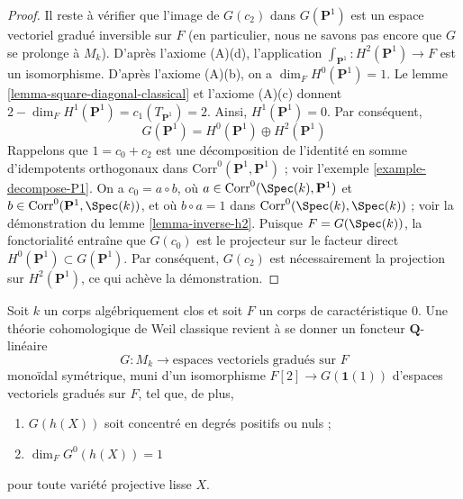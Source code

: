 \begin{proof}
\medskip\noindent
Il reste à vérifier que l'image de $G(c_2)$ dans $G(\mathbf{P}^1)$
est un espace vectoriel gradué inversible sur $F$ (en particulier, nous ne savons pas encore
que $G$ se prolonge à $M_k$).
D'après l'axiome (A)(d), l'application $\int_{\mathbf{P}^1} : H^2(\mathbf{P}^1) \to F$
est un isomorphisme. D'après l'axiome (A)(b), on a $\dim_F H^0(\mathbf{P}^1) = 1$.
Le lemme \ref{lemma-square-diagonal-classical} et l'axiome (A)(c)
donnent $2 - \dim_F H^1(\mathbf{P}^1) = c_1(T_{\mathbf{P}^1}) = 2$.
Ainsi, $H^1(\mathbf{P}^1) = 0$. Par conséquent,
$$
G(\mathbf{P}^1) = H^0(\mathbf{P}^1) \oplus H^2(\mathbf{P}^1)
$$
Rappelons que $1 = c_0 + c_2$ est une décomposition de l'identité
en somme d'idempotents orthogonaux dans
$\text{Corr}^0(\mathbf{P}^1, \mathbf{P}^1)$ ; voir
l'exemple \ref{example-decompose-P1}. On a $c_0 = a \circ b$, où
$a \in \text{Corr}^0(\Spec(k), \mathbf{P}^1)$ et
$b \in \text{Corr}^0(\mathbf{P}^1, \Spec(k))$, et où
$b \circ a = 1$ dans $\text{Corr}^0(\Spec(k), \Spec(k))$ ; voir la démonstration du
lemme \ref{lemma-inverse-h2}. Puisque $F = G(\Spec(k))$, la
fonctorialité entraîne que $G(c_0)$ est le projecteur sur le facteur direct
$H^0(\mathbf{P}^1) \subset G(\mathbf{P}^1)$. Par conséquent,
$G(c_2)$ est nécessairement la projection sur $H^2(\mathbf{P}^1)$,
ce qui achève la démonstration.
\end{proof}

\begin{proposition}
\label{proposition-weil-cohomology-theory-classical}
Soit $k$ un corps algébriquement clos et soit $F$ un corps de
caractéristique $0$. Une théorie cohomologique de Weil classique revient à se donner
un foncteur $\mathbf{Q}$-linéaire
$$
G : M_k \longrightarrow \text{espaces vectoriels gradués sur }F\text{}
$$
monoïdal symétrique, muni d'un isomorphisme
$F[2] \to G(\mathbf{1}(1))$ d'espaces vectoriels gradués sur $F$, tel que,
de plus,
\begin{enumerate}
\item $G(h(X))$ soit concentré en degrés positifs ou nuls ;
\item $\dim_F G^0(h(X)) = 1$
\end{enumerate}
pour toute variété projective lisse $X$.
\end{proposition}

